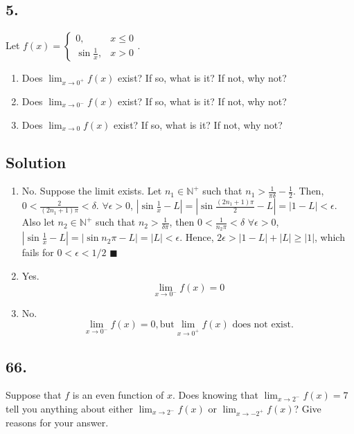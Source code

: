 \documentclass{article}
\begin{document}
\subsection*{5.}
Let $f(x)=\left\{\begin{array}{ll}0,&x\leq 0\\\sin{\frac{1}{x}},&x>0\end{array}\right.$.
\begin{enumerate} [label=\alph*]
    \item Does $\lim _{x\to 0^+} f(x)$ exist? If so, what is it? If not, why not?
    \item Does $\lim _{x\to 0^-} f(x)$ exist? If so, what is it? If not, why not?
    \item Does $\lim _{x\to 0} f(x)$ exist? If so, what is it? If not, why not?
\end{enumerate}
\subsection*{Solution} 
\begin{enumerate} [label=\alph*]
    \item No. \newline Suppose the limit exists.\newline
    Let $n_1\in\mathbb{N}^+$ such that $n_1>\frac{1}{\pi\delta}-\frac{1}{2}$. Then,  $0<\frac{2}{(2n_1+1)\pi}<\delta$.\newline
    $\forall \epsilon>0$,\newline
    $|\sin{\frac{1}{x}}-L|=|\sin{\frac{(2n_1+1)\pi}{2}}-L|=|1-L|<\epsilon$.\newline
    Also let $n_2\in\mathbb{N}^+$ such that $n_2>\frac{1}{\delta\pi}$, then $0<\frac{1}{n_2\pi}<\delta$\newline
    $\forall \epsilon>0$,\newline
    $|\sin{\frac{1}{x}}-L|=|\sin{n_2\pi}-L|=|L|<\epsilon$.\newline
    Hence, $2\epsilon>|1-L|+|L|\geq|1|$, which fails for $0<\epsilon<1/2$\newline
    $\blacksquare$
    \item Yes. 
    \[\lim _{x\to 0^-}f(x)=0\]
    \item No.
    \[\lim _{x\to 0^-}f(x)=0,\text{but} \lim _{x\to 0^+}f(x)\text{ does not exist.}\]
\end{enumerate}
\subsection*{66.}
Suppose that $f$ is an even function of $x$. Does knowing that $\lim _{x\to 2^-} f(x)=7$ tell you anything about either $\lim _{x\to 2^-} f(x)$ or $\lim _{x\to -2^+} f(x)$? Give reasons for your answer.
\end{document}
